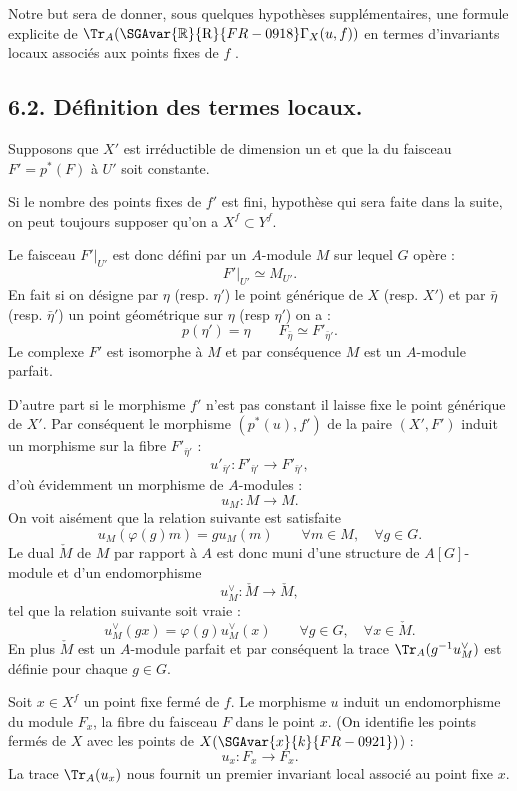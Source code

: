 Notre but sera de donner, sous quelques hypothèses supplémentaires, une formule explicite de $\Tr_A(\SGAvar{\mathbb{R}}{\mathrm{R}}{FR-0918}\Gamma_X(u, f))$ en termes d'invariants locaux associés aux points fixes de $f$ .

\bigskip

\subsection*{6.2. Définition des termes locaux.}
Supposons que $X'$ est irréductible de dimension un et que la  du faisceau $F'=p^*(F)$ à $U'$ soit constante.

Si le nombre des points fixes de $f'$ est fini, hypothèse qui sera faite dans la suite, on peut toujours supposer qu'on a $X^f \subset Y^f$.

Le faisceau $F'|_{U'}$ est donc défini par un $A$-module $M$ sur lequel $G$ opère :
\[
F'|_{U'} \simeq M_{U'} .
\]
En fait si on désigne par $\eta$ (resp. $\eta'$) le point générique de $X$ (resp. $X'$) et par $\bar\eta$ (resp. $\bar\eta'$) un point géométrique sur $\eta$ (resp $\eta'$) on a :
\[
p(\eta')=\eta\qquad F_{\bar\eta} \simeq F'_{\bar\eta'} .
\]
Le complexe $F'$ est isomorphe à $M$ et par conséquence $M$ est un $A$-module parfait.

D'autre part si le morphisme $f'$ n'est pas constant il laisse fixe le point générique de $X'$. Par conséquent le morphisme $(p^*(u),f')$ de la paire $(X',F')$ induit un morphisme sur la fibre $F'_{\bar\eta'}$ :
\[
u'_{\bar\eta'}:F'_{\bar\eta'}\longrightarrow F'_{\bar\eta'} ,
\]
d'où évidemment un morphisme de $A$-modules :
\[
u_M:M\longrightarrow M .
\]
On
voit aisément que la relation suivante est satisfaite
\begin{equation}\tag{6.2.1}
u_M(\varphi(g)m)=g u_M(m) \qquad \forall m\in M,\quad \forall g\in G .
\end{equation}
Le dual $\check{M}$ de $M$ par rapport à $A$ est donc muni d'une structure de $A[G]$-module et d'un endomorphisme
\[
u_M^\vee:\check{M}\longrightarrow \check{M} ,
\]
tel que la relation suivante soit vraie :
\[
u_M^\vee(gx)=\varphi(g)u_M^\vee(x) \qquad \forall g\in G,\quad \forall x\in \check{M} .
\]
En plus $\check{M}$ est un $A$-module parfait et par conséquent la trace $\Tr_A(g^{-1}u_M^\vee)$ est définie pour chaque $g\in G$.

Soit $x\in X^f$ un point fixe fermé de $f$. Le morphisme $u$ induit un endomorphisme du module $F_x$, la fibre du faisceau $F$ dans le point $x$. (On identifie les points fermés de $X$ avec les points de $X(\SGAvar{x}{k}{FR-0921})$) :
\[
u_x:F_x\longrightarrow F_x .
\]
La trace $\Tr_A(u_x)$ nous fournit un premier invariant local associé au point fixe $x$.

